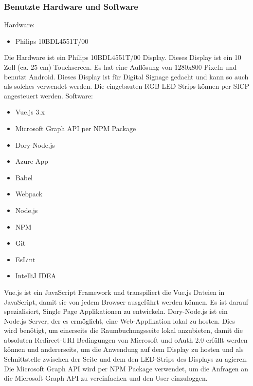 \subsubsection{Benutzte Hardware und Software}
Hardware:
\begin{itemize}
    \item Philips 10BDL4551T/00
\end{itemize}
\newline
Die Hardware ist ein Philips 10BDL4551T/00 Display.
Dieses Display ist ein 10 Zoll (ca. 25 cm) Touchscreen.
Es hat eine Auflösung von 1280x800 Pixeln und benutzt Android.
Dieses Display ist für Digital Signage gedacht und kann so auch als solches verwendet werden.
Die eingebauten RGB LED Strips können per SICP angesteuert werden.
\newline
\newline
Software:
\begin{itemize}
    \item Vue.js 3.x
    \item Microsoft Graph API per NPM Package
    \item Dory-Node.js
    \item Azure App
    \item Babel
    \item Webpack
    \item Node.js
    \item NPM
    \item Git
    \item EsLint
    \item IntelliJ IDEA
\end{itemize}
\newline
Vue.js ist ein JavaScript Framework und transpiliert die Vue.js Dateien in JavaScript, damit sie von jedem Browser ausgeführt werden können.
Es ist darauf spezialisiert, Single Page Applikationen zu entwickeln.
\newline
\newline
Dory-Node.js ist ein Node.js Server, der es ermöglicht, eine Web-Applikation lokal zu hosten.
Dies wird benötigt, um einerseits die Raumbuchungsseite lokal anzubieten, damit die absoluten Redirect-URI Bedingungen von Microsoft und oAuth 2.0 erfüllt werden können und andererseits, um die Anwendung auf dem Display zu hosten und als Schnittstelle zwischen der Seite und dem den LED-Strips des Displays zu agieren.
\newline
\newline
Die Microsoft Graph API wird per NPM Package verwendet, um die Anfragen an die Microsoft Graph API zu vereinfachen und den User einzuloggen.
